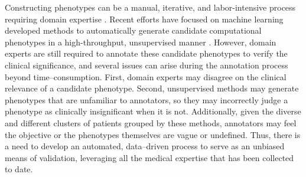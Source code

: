 \documentclass{sig-alternate}
\begin{document}
Constructing phenotypes can be a manual, iterative, and labor-intensive process requiring domain expertise \cite{carroll2011naive,chen2013applying,hripcsak2013next}. 
Recent efforts have focused on machine learning developed methods to automatically generate candidate computational phenotypes in a high-throughput, unsupervised manner \cite{Ho:2014jc,Ho:2014da, hu2015scalable, wang2015rubik,Yu:2015fj}.
However, domain experts are still required to annotate these candidate phenotypes to verify the clinical significance, and several issues can arise during the annotation process beyond time--consumption.
First, domain experts may disagree on the clinical relevance of a candidate phenotype. 
Second, unsupervised methods may generate phenotypes that are unfamiliar to annotators, so they may incorrectly judge a phenotype as clinically insignificant when it is not.
Additionally, given the diverse and different clusters of patients grouped by these methods, annotators may feel the objective or the phenotypes themselves are vague or undefined.
Thus, there is a need to develop an automated, data--driven process to serve as an unbiased means of validation, leveraging all the medical expertise that has been collected to date.


\end{document}
